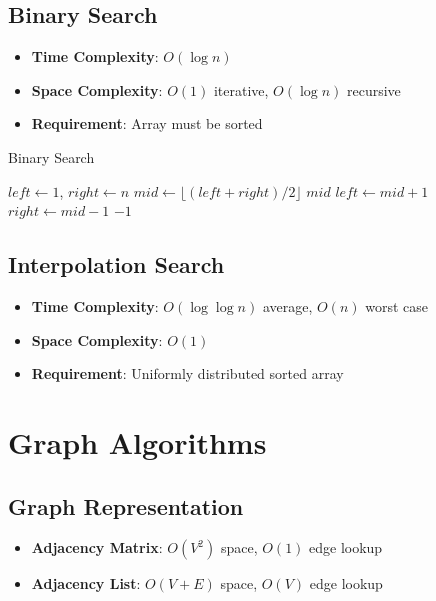 \documentclass[11pt]{article}
\theoremstyle{definition}
\begin{document}
\subsection{Binary Search}
\begin{itemize}
    \item \textbf{Time Complexity}: $O(\log n)$
    \item \textbf{Space Complexity}: $O(1)$ iterative, $O(\log n)$ recursive
    \item \textbf{Requirement}: Array must be sorted
\end{itemize}

\begin{algorithm}
\caption{Binary Search}
\begin{algorithmic}[1]
    \State $left \gets 1$, $right \gets n$
        \State $mid \gets \lfloor (left + right) / 2 \rfloor$
            \State \Return $mid$
            \State $left \gets mid + 1$
        \Else
            \State $right \gets mid - 1$
        \EndIf
    \EndWhile
    \State \Return $-1$ 
\EndProcedure
\end{algorithmic}
\end{algorithm}

\subsection{Interpolation Search}
\begin{itemize}
    \item \textbf{Time Complexity}: $O(\log \log n)$ average, $O(n)$ worst case
    \item \textbf{Space Complexity}: $O(1)$
    \item \textbf{Requirement}: Uniformly distributed sorted array
\end{itemize}

\section{Graph Algorithms}

\subsection{Graph Representation}
\begin{itemize}
    \item \textbf{Adjacency Matrix}: $O(V^2)$ space, $O(1)$ edge lookup
    \item \textbf{Adjacency List}: $O(V + E)$ space, $O(V)$ edge lookup
\end{itemize}
\end{document}
